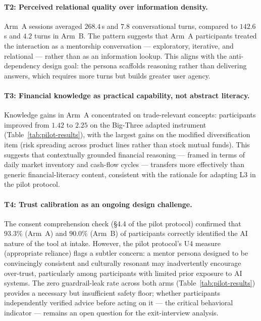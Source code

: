 \paragraph{T2: Perceived relational quality over information density.}
Arm~A sessions averaged $268.4$\,s and $7.8$ conversational turns, compared to $142.6$\,s and $4.2$ turns in Arm~B. The pattern suggests that Arm~A participants treated the interaction as a mentorship conversation --- exploratory, iterative, and relational --- rather than as an information lookup. This aligns with the anti-dependency design goal: the persona scaffolds reasoning rather than delivering answers, which requires more turns but builds greater user agency.

\paragraph{T3: Financial knowledge as practical capability, not abstract literacy.}
Knowledge gains in Arm~A concentrated on trade-relevant concepts: participants improved from $1.42$ to $2.25$ on the Big-Three adapted instrument (Table~\ref{tab:pilot-results}), with the largest gains on the modified diversification item (risk spreading across product lines rather than stock mutual funds). This suggests that contextually grounded financial reasoning --- framed in terms of daily market inventory and cash-flow cycles --- transfers more effectively than generic financial-literacy content, consistent with the rationale for adapting L3 in the pilot protocol.

\paragraph{T4: Trust calibration as an ongoing design challenge.}
The consent comprehension check (§4.4 of the pilot protocol) confirmed that $93.3\%$ (Arm~A) and $90.0\%$ (Arm~B) of participants correctly identified the AI nature of the tool at intake. However, the pilot protocol's U4 measure (appropriate reliance) flags a subtler concern: a mentor persona designed to be convincingly consistent and culturally resonant may inadvertently encourage over-trust, particularly among participants with limited prior exposure to AI systems. The zero guardrail-leak rate across both arms (Table~\ref{tab:pilot-results}) provides a necessary but insufficient safety floor; whether participants independently verified advice before acting on it --- the critical behavioral indicator --- remains an open question for the exit-interview analysis.

